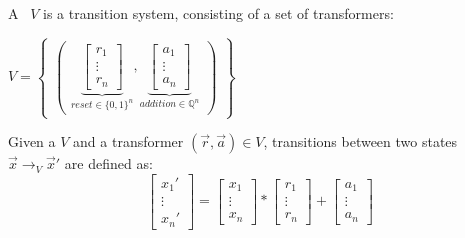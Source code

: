 \documentclass[%
10pt,
dvipsnames,
]{beamer}
\begin{document}
\begin{frame}[t]
	\frametitle{\qvasr}
	\begin{definition}
			A \qvasr\ $V$ is a transition system, consisting of a set of transformers: \\
			\begin{center}
			 $ V = 
			\begin{Bmatrix}
				\begin{pmatrix}
					\underbrace{
					\begin{bmatrix}
						r_1 \\
						\vdots \\
						r_n
					\end{bmatrix}}_{reset \in \{0,1\}^n},
					\underbrace{
					\begin{bmatrix}
						a_1 \\
						\vdots \\
						a_n
					\end{bmatrix}}_{addition \in \mathbb{Q}^n}
				\end{pmatrix}
			\end{Bmatrix}
		$
		\end{center}
	\end{definition}
	\begin{definition}
	Given a \qvasr $V$ and a transformer $(\vec{r}, \vec{a}) \in V$, transitions between two states $\vec{x} \rightarrow_V \vec{x}'$ are defined as: \\
	\begin{equation*}
			\begin{bmatrix}
				x_1' \\
				\vdots \\
				x_n'
			\end{bmatrix}
		=
			\begin{bmatrix}
				x_1 \\
				\vdots \\
				x_n
			\end{bmatrix}
		*
			\begin{bmatrix}
			r_1 \\
			\vdots \\
			r_n
			\end{bmatrix}
		+
			\begin{bmatrix}
			a_1 \\
			\vdots \\
			a_n
		\end{bmatrix}		
	\end{equation*}
	\end{definition}
\end{frame}
\end{document}
